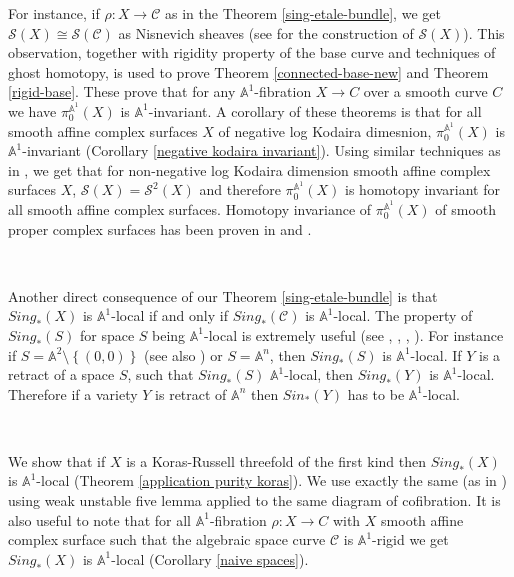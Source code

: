 \documentclass[11pt, reqno]{amsart}
\theoremstyle{plain}
\theoremstyle{definition}
\newcommand{\sS}{{\mathcal S}}
\begin{document}
For instance, if $\rho : X \to \mathcal{C}$ as in the Theorem  \ref{sing-etale-bundle}, we get  $\sS(X) \cong \sS(\mathcal{C})$ as Nisnevich sheaves (see \cite[Definition 2.9]{bhs} for the construction of $\sS(X)$). This observation, together with rigidity property of the base curve and techniques of ghost homotopy, is used to prove Theorem \ref{connected-base-new} and Theorem \ref{rigid-base}. These prove that for any $\mathbb{A}^1$-fibration $X \to C$ over a smooth curve $C$ we have $\pi_0^{\mathbb{A}^1}(X)$ is $\mathbb{A}^1$-invariant. A corollary of these theorems is  that for all smooth affine complex surfaces $X$ of negative log Kodaira dimesnion, $\pi_0^{\mathbb{A}^1}(X)$ is $\mathbb{A}^1$-invariant (Corollary \ref{negative kodaira invariant}).
Using similar techniques as in \cite[Proposition 2.9]{choudhury2}, 
we get that for non-negative log Kodaira dimension smooth affine complex surfaces $X$, $\sS(X) = \sS^2(X)$ and therefore $\pi_0^{\mathbb{A}^1}(X)$ is homotopy invariant for all smooth affine complex surfaces. Homotopy invariance of $\pi_0^{\mathbb{A}^1}(X)$ of smooth proper complex surfaces has been proven in \cite[Corollary 3.15]{bhs} and \cite[Theorem 1.2]{bs}.  


\

Another direct consequence of our Theorem \ref{sing-etale-bundle} is that $Sing_*(X)$ is $\mathbb{A}^1$-local if and only if $Sing_*(\mathcal{C})$ is $\mathbb{A}^1$-local. The property of $Sing_*(S)$ for space $S$ being $\mathbb{A}^1$-local is extremely useful (see \cite{am}, \cite{asokI}, \cite{asokII}, \cite{balwe reductive}).
For instance if $S = \mathbb{A}^2 \setminus \left\{(0,0)\right\}$ \cite[Theorem 8.9]{mor} (see also \cite[Corollary 4.2.6]{asokII})
or $S = \mathbb{A}^n$, then $Sing_*(S)$ is $\mathbb{A}^1$-local. If $Y$ is a retract of a space $S$, such that $Sing_*(S)$ $\mathbb{A}^1$-local, then $Sing_*(Y)$ is $\mathbb{A}^1$-local. Therefore if a variety $Y$ is retract of $\mathbb{A}^n$ then $Sin_*(Y)$ has to be $\mathbb{A}^1$-local.  

\

We show that if $X$ is a Koras-Russell threefold of the first kind then $Sing_*(X)$ is $\mathbb{A}^1$-local (Theorem \ref{application purity koras}). We use exactly the same (as in 
\cite{df}) using weak unstable five lemma applied to the same diagram of cofibration. It is also useful to note that for all $\mathbb{A}^1$-fibration $\rho : X \to C$ with $X$ smooth affine complex surface  such that the algebraic space curve $\mathcal{C}$ is $\mathbb{A}^1$-rigid we get $Sing_*(X)$ is $\mathbb{A}^1$-local (Corollary \ref{naive spaces}).
\end{document}

